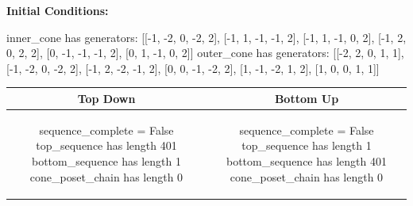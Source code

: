 \documentclass[10pt]{article}
\begin{document}
\textbf{Initial Conditions:}
\begin{SAGE}
inner_cone has generators: 
[[-1, -2, 0, -2, 2], [-1, 1, -1, -1, 2], [-1, 1, -1, 0, 2], [-1, 2, 0, 2, 2], [0, -1, -1, -1, 2], [0, 1, -1, 0, 2]]
outer_cone has generators: 
[[-2, 2, 0, 1, 1], [-1, -2, 0, -2, 2], [-1, 2, -2, -1, 2], [0, 0, -1, -2, 2], [1, -1, -2, 1, 2], [1, 0, 0, 1, 1]]

\end{SAGE}
\begin{tabular}{c|c}
\textbf{Top Down} & \textbf{Bottom Up} \\ \hline  
\begin{SAGE}
sequence_complete = False
top_sequence has length 401
bottom_sequence has length 1
cone_poset_chain has length 0
\end{SAGE} 
&
\begin{SAGE}
sequence_complete = False
top_sequence has length 1
bottom_sequence has length 401
cone_poset_chain has length 0
\end{SAGE} 
\\ \hline


\end{tabular}
\end{document}
